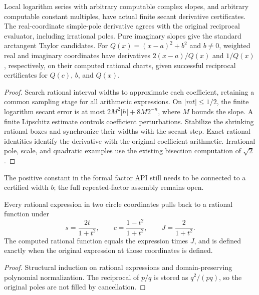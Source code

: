 \begin{theorem}
\label{thm:computable-elementary-derivatives}
\leanok
Local logarithm series with arbitrary computable complex slopes, and arbitrary
computable constant multiples, have actual finite secant derivative certificates.
The real-coordinate simple-pole derivative agrees with the original reciprocal
evaluator, including irrational poles. Pure imaginary slopes give the standard
arctangent Taylor candidates. For $Q(x)=(x-a)^2+b^2$ and $b\ne0$, weighted real
and imaginary coordinates have derivatives $2(x-a)/Q(x)$ and $1/Q(x)$,
respectively, on their computed rational charts, given successful reciprocal
certificates for $Q(c)$, $b$, and $Q(x)$.
\end{theorem}
\begin{proof}\leanok
Search rational interval widths to approximate each coefficient, retaining a
common sampling stage for all arithmetic expressions. On $|mt|\le1/2$, the
finite logarithm secant error is at most $2M^2|h|+8M2^{-n}$, where $M$ bounds
the slope. A finite Lipschitz estimate controls coefficient perturbations.
Stabilize the shrinking rational boxes and synchronize their widths with the
secant step. Exact rational identities identify the derivative with the original
coefficient arithmetic. Irrational pole, scale, and quadratic examples use the
existing bisection computation of $\sqrt2$.
\end{proof}
The positive constant in the formal factor API still needs to be connected to
a certified width $b$; the full repeated-factor assembly remains open.

\begin{theorem}
\label{thm:rational-circle-pullback}
\leanok
Every rational expression in two circle coordinates pulls back to a rational
function under
\[
 s=\frac{2t}{1+t^2},\qquad c=\frac{1-t^2}{1+t^2},
 \qquad J=\frac2{1+t^2}.
\]
The computed rational function equals the expression times \(J\), and is
defined exactly when the original expression at those coordinates is defined.
\end{theorem}
\begin{proof}\leanok
Structural induction on rational expressions and domain-preserving polynomial
normalization. The reciprocal of \(p/q\) is stored as \(q^2/(pq)\), so the
original poles are not filled by cancellation.
\end{proof}


